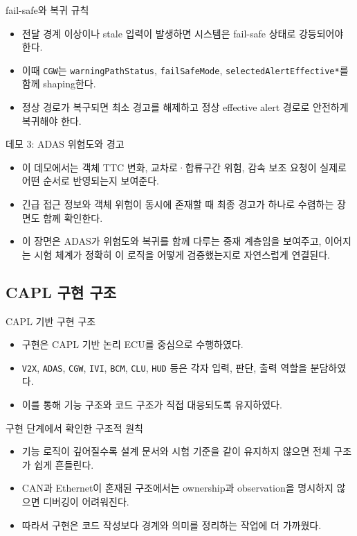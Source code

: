 \documentclass[aspectratio=169,10pt]{beamer}
\begin{document}
\begin{frame}{fail-safe와 복귀 규칙}
\begin{itemize}
  \item 전달 경계 이상이나 stale 입력이 발생하면 시스템은 fail-safe 상태로 강등되어야 한다.
  \item 이때 \texttt{CGW}는 \texttt{warningPathStatus}, \texttt{failSafeMode}, \texttt{selectedAlertEffective*}를 함께 shaping한다.
  \item 정상 경로가 복구되면 최소 경고를 해제하고 정상 effective alert 경로로 안전하게 복귀해야 한다.
\end{itemize}
\end{frame}

\begin{frame}{데모 3: ADAS 위험도와 경고}
\begin{itemize}
  \item 이 데모에서는 객체 TTC 변화, 교차로·합류구간 위험, 감속 보조 요청이 실제로 어떤 순서로 반영되는지 보여준다.
  \item 긴급 접근 정보와 객체 위험이 동시에 존재할 때 최종 경고가 하나로 수렴하는 장면도 함께 확인한다.
  \item 이 장면은 ADAS가 위험도와 복귀를 함께 다루는 중재 계층임을 보여주고, 이어지는 시험 체계가 정확히 이 로직을 어떻게 검증했는지로 자연스럽게 연결된다.
\end{itemize}
\end{frame}

\subsection{CAPL 구현 구조}
\begin{frame}{CAPL 기반 구현 구조}
\begin{itemize}
  \item 구현은 CAPL 기반 논리 ECU를 중심으로 수행하였다.
  \item \texttt{V2X}, \texttt{ADAS}, \texttt{CGW}, \texttt{IVI}, \texttt{BCM}, \texttt{CLU}, \texttt{HUD} 등은 각자 입력, 판단, 출력 역할을 분담하였다.
  \item 이를 통해 기능 구조와 코드 구조가 직접 대응되도록 유지하였다.
\end{itemize}
\end{frame}

\begin{frame}{구현 단계에서 확인한 구조적 원칙}
\begin{itemize}
  \item 기능 로직이 깊어질수록 설계 문서와 시험 기준을 같이 유지하지 않으면 전체 구조가 쉽게 흔들린다.
  \item CAN과 Ethernet이 혼재된 구조에서는 ownership과 observation을 명시하지 않으면 디버깅이 어려워진다.
  \item 따라서 구현은 코드 작성보다 경계와 의미를 정리하는 작업에 더 가까웠다.
\end{itemize}
\end{frame}
\end{document}

